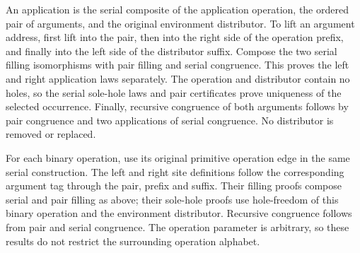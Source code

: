 



An application is the serial composite of the application operation, the
ordered pair of arguments, and the original environment distributor. To lift
an argument address, first lift into the pair, then into the right side of
the operation prefix, and finally into the left side of the distributor
suffix. Compose the two serial filling isomorphisms with pair filling and
serial congruence. This proves the left and right application laws separately.
The operation and distributor contain no holes, so the serial sole-hole laws
and pair certificates prove uniqueness of the selected occurrence. Finally,
recursive congruence of both arguments follows by pair congruence and two
applications of serial congruence. No distributor is removed or replaced.









For each binary operation, use its original primitive operation edge in the
same serial construction. The left and right site definitions follow the
corresponding argument tag through the pair, prefix and suffix. Their filling
proofs compose serial and pair filling as above; their sole-hole proofs use
hole-freedom of this binary operation and the environment distributor. Recursive
congruence follows from pair and serial congruence. The operation parameter is
arbitrary, so these results do not restrict the surrounding operation alphabet.



